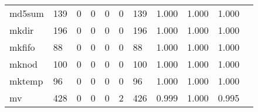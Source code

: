 \begin{longtable}{lp{1.2cm}p{1.2cm}p{1.2cm}p{1.2cm}p{1.2cm}p{1.2cm}p{1.2cm}p{1.2cm}p{1.2cm}p{1.2cm}}
md5sum    &                                   139 &                                                  0 &                                                  0 &                                                  0 &                                                  0 &                                                139 &                                         1.000 &                                              1.000 &                                              1.000 \\
mkdir     &                                   196 &                                                  0 &                                                  0 &                                                  0 &                                                  0 &                                                196 &                                         1.000 &                                              1.000 &                                              1.000 \\
mkfifo    &                                    88 &                                                  0 &                                                  0 &                                                  0 &                                                  0 &                                                 88 &                                         1.000 &                                              1.000 &                                              1.000 \\
mknod     &                                   100 &                                                  0 &                                                  0 &                                                  0 &                                                  0 &                                                100 &                                         1.000 &                                              1.000 &                                              1.000 \\
mktemp    &                                    96 &                                                  0 &                                                  0 &                                                  0 &                                                  0 &                                                 96 &                                         1.000 &                                              1.000 &                                              1.000 \\
mv        &                                   428 &                                                  0 &                                                  0 &                                                  0 &                                                  2 &                                                426 &                                         0.999 &                                              1.000 &                                              0.995 \\

\end{longtable}
